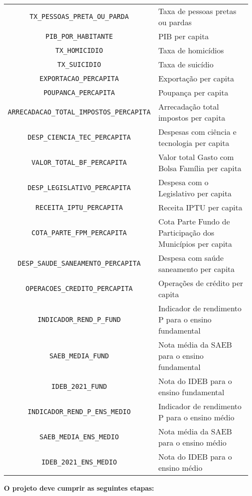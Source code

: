 \documentclass[thmsa,11pt]{article}
\begin{document}
\begin{table}[htb!]
\begin{tabular}{|c|l|}
		\verb|TX_PESSOAS_PRETA_OU_PARDA| & Taxa de pessoas pretas ou pardas \\
		\verb|PIB_POR_HABITANTE| & PIB per capita\\
		\verb|TX_HOMICIDIO| & Taxa de homicídios\\
		\verb|TX_SUICIDIO| & Taxa de suicídio\\
		\verb|EXPORTACAO_PERCAPITA| & Exportação per capita\\
		\verb|POUPANCA_PERCAPITA| & Poupança per capita\\
		\verb|ARRECADACAO_TOTAL_IMPOSTOS_PERCAPITA| & Arrecadação total impostos per capita\\
		\verb|DESP_CIENCIA_TEC_PERCAPITA| & Despesas com ciência e tecnologia per capita\\
		\verb|VALOR_TOTAL_BF_PERCAPITA| & Valor total Gasto com Bolsa Família per capita\\
		\verb|DESP_LEGISLATIVO_PERCAPITA| & Despesa com o Legislativo per capita \\
		\verb|RECEITA_IPTU_PERCAPITA| & Receita IPTU per capita\\
		\verb|COTA_PARTE_FPM_PERCAPITA| & Cota Parte Fundo de Participação dos Municípios per capita \\
		\verb|DESP_SAUDE_SANEAMENTO_PERCAPITA| & Despesa com saúde saneamento per capita\\
		\verb|OPERACOES_CREDITO_PERCAPITA| & Operações de crédito per capita\\
		\verb|INDICADOR_REND_P_FUND| & Indicador de rendimento P para o ensino fundamental\\
		\verb|SAEB_MEDIA_FUND| & Nota média da SAEB para o ensino fundamental\\
		\verb|IDEB_2021_FUND| & Nota do IDEB para o ensino fundamental\\
		\verb|INDICADOR_REND_P_ENS_MEDIO| & Indicador de rendimento P para o ensino médio\\
		\verb|SAEB_MEDIA_ENS_MEDIO| & Nota média da SAEB para o ensino médio\\
		\verb|IDEB_2021_ENS_MEDIO| & Nota do IDEB para o ensino médio\\
		\hline
	\end{tabular}
\end{table}


\bigskip

\textbf{O projeto deve cumprir as seguintes etapas: }
\end{document}
